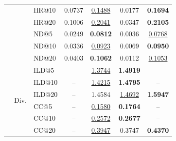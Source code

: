\begin{table}[t]
\begin{tabular}{lllcccc}
 & & HR@10 & 0.0737 & \underline{0.1488} & 0.0177 & \textbf{0.1694} \\
 & & HR@20 & 0.1006 & \underline{0.2041} & 0.0347 & \textbf{0.2105} \\
 & & ND@5  & 0.0249 & \textbf{0.0812} & 0.0036 & \underline{0.0768} \\
 & & ND@10 & 0.0336 & \underline{0.0923} & 0.0069 & \textbf{0.0950} \\
 & & ND@20 & 0.0403 & \textbf{0.1062} & 0.0112 & \underline{0.1053} \\
 & \multirow{6}{*}{Div.}
 & ILD@5  & -- & \underline{1.3744} & \textbf{1.4919} & -- \\
 & & ILD@10 & -- & \underline{1.4215} & \textbf{1.4795} & -- \\
 & & ILD@20 & -- & 1.4584 & \underline{1.4692} & \textbf{1.5947} \\
 & & CC@5   & -- & \underline{0.1580} & \textbf{0.1764} & -- \\
 & & CC@10  & -- & \underline{0.2572} & \textbf{0.2677} & -- \\
 & & CC@20  & -- & \underline{0.3947} & 0.3747 & \textbf{0.4370} \\
\bottomrule
\end{tabular}
\end{table}
